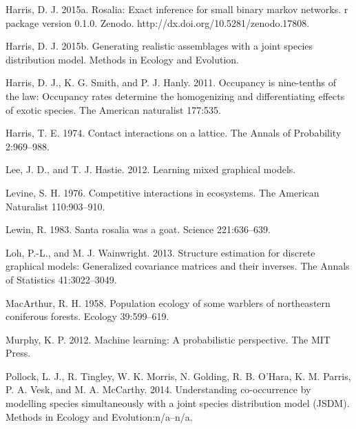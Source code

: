 \documentclass[12pt,]{article}
\begin{document}
\begin{spacing}{1.9}
\begin{flushleft}
Harris, D. J. 2015a. Rosalia: Exact inference for small binary markov
networks. r package version 0.1.0. Zenodo.
http://dx.doi.org/10.5281/zenodo.17808.

Harris, D. J. 2015b. Generating realistic assemblages with a joint
species distribution model. Methods in Ecology and Evolution.

Harris, D. J., K. G. Smith, and P. J. Hanly. 2011. Occupancy is
nine-tenths of the law: Occupancy rates determine the homogenizing and
differentiating effects of exotic species. The American naturalist
177:535.

Harris, T. E. 1974. Contact interactions on a lattice. The Annals of
Probability 2:969--988.

Lee, J. D., and T. J. Hastie. 2012. Learning mixed graphical models.

Levine, S. H. 1976. Competitive interactions in ecosystems. The American
Naturalist 110:903--910.

Lewin, R. 1983. Santa rosalia was a goat. Science 221:636--639.

Loh, P.-L., and M. J. Wainwright. 2013. Structure estimation for
discrete graphical models: Generalized covariance matrices and their
inverses. The Annals of Statistics 41:3022--3049.

MacArthur, R. H. 1958. Population ecology of some warblers of
northeastern coniferous forests. Ecology 39:599--619.

Murphy, K. P. 2012. Machine learning: A probabilistic perspective. The
MIT Press.

Pollock, L. J., R. Tingley, W. K. Morris, N. Golding, R. B. O'Hara, K.
M. Parris, P. A. Vesk, and M. A. McCarthy. 2014. Understanding
co-occurrence by modelling species simultaneously with a joint species
distribution model (JSDM). Methods in Ecology and Evolution:n/a--n/a.


\end{flushleft}
\end{spacing}
\end{document}
